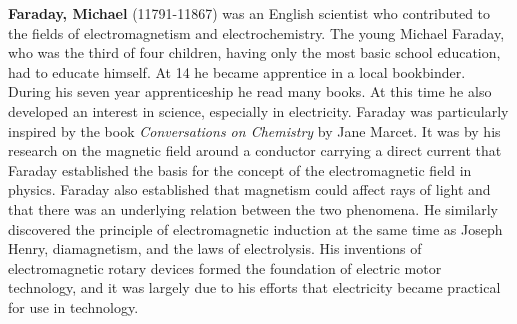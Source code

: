 \textbf{Faraday, Michael} (11791-11867) was an English scientist who contributed to the fields of electromagnetism and electrochemistry. The young Michael Faraday, who was the third of four children, having only the most basic school education, had to educate himself. At 14 he became apprentice in a local bookbinder. During his seven year apprenticeship he read many books. At this time he also developed an interest in science, especially in electricity. Faraday was particularly inspired by the book \textit{Conversations on Chemistry} by Jane Marcet. It was by his research on the magnetic field around a conductor carrying a direct current that Faraday established the basis for the concept of the electromagnetic field in physics. Faraday also established that magnetism could affect rays of light and that there was an underlying relation between the two phenomena. He similarly discovered the principle of electromagnetic induction at the same time as Joseph Henry, diamagnetism, and the laws of electrolysis. His inventions of electromagnetic rotary devices formed the foundation of electric motor technology, and it was largely due to his efforts that electricity became practical for use in technology.

